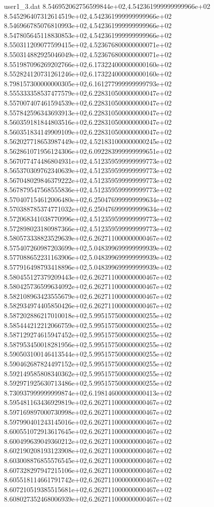 \begin{filecontents}{user1_3.dat}
8.546952062756599844e+02,4.542361999999999966e+02
8.545296407312614519e+02,4.542361999999999966e+02
8.546966785076810993e+02,4.542361999999999966e+02
8.547805645118830853e+02,4.542361999999999966e+02
8.550311209077599415e+02,4.523676800000000071e+02
8.550314882925046049e+02,4.523676800000000071e+02
8.551987096269202766e+02,6.173224000000000160e+02
8.552824120731261246e+02,6.173224000000000160e+02
8.798157300000000305e+02,6.161277999999999793e+02
8.555333358537477579e+02,6.228310500000000047e+02
8.557007407461594539e+02,6.228310500000000047e+02
8.557842596343693913e+02,6.228310500000000047e+02
8.560359181844803516e+02,6.228310500000000047e+02
8.560351834149909109e+02,6.228310500000000047e+02
8.562027718653987449e+02,4.521831000000000245e+02
8.562861071956124306e+02,6.092283999999999651e+02
8.567077474486804931e+02,4.512359599999999773e+02
8.565370309762340639e+02,4.512359599999999773e+02
8.567048029846379222e+02,4.512359599999999773e+02
8.567879547568555836e+02,4.512359599999999773e+02
8.570407154612006480e+02,6.250476999999999634e+02
8.570388785374771032e+02,6.250476999999999634e+02
8.572068341038770996e+02,4.512359599999999773e+02
8.572898023180987366e+02,4.512359599999999773e+02
8.580573338823529639e+02,6.262711000000000467e+02
8.575407260987203699e+02,5.048399699999999939e+02
8.577088652231163906e+02,5.048399699999999939e+02
8.577916498793418896e+02,5.048399699999999939e+02
8.580455127379209443e+02,6.262711000000000467e+02
8.580425736599634092e+02,6.262711000000000467e+02
8.582108963423555679e+02,6.262711000000000467e+02
8.582934974405850426e+02,6.262711000000000467e+02
8.587202886217010018e+02,5.995157500000000255e+02
8.585444212212066759e+02,5.995157500000000255e+02
8.587129274615947452e+02,5.995157500000000255e+02
8.587953450018281956e+02,5.995157500000000255e+02
8.590503100146413544e+02,5.995157500000000255e+02
8.590462687824497152e+02,5.995157500000000255e+02
8.592149585808340362e+02,5.995157500000000255e+02
8.592971925630713486e+02,5.995157500000000255e+02
8.730937999999999874e+02,6.198146000000000413e+02
8.595481163436929819e+02,6.262711000000000467e+02
8.597169897000730998e+02,6.262711000000000467e+02
8.597990401243145016e+02,6.262711000000000467e+02
8.600551072913617645e+02,6.262711000000000467e+02
8.600499639049360212e+02,6.262711000000000467e+02
8.602190208193123908e+02,6.262711000000000467e+02
8.603008876855576545e+02,6.262711000000000467e+02
8.607328297947215106e+02,6.262711000000000467e+02
8.605518114661791742e+02,6.262711000000000467e+02
8.607210519385515681e+02,6.262711000000000467e+02
8.608027352468006939e+02,6.262711000000000467e+02

\end{filecontents}
